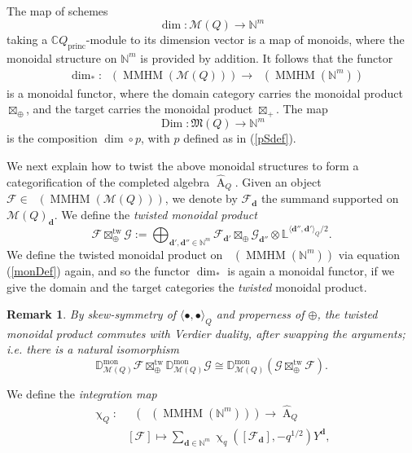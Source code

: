\documentclass[a4paper,10pt]{amsart}
\newtheorem{remark}[theorem]{Remark}
\newcommand{\dd}{\mathbf{d}}
\newcommand{\DD}{\mathbb{D}}
\newcommand{\LL}{\mathbb{L}}
\newcommand{\Mst}{\mathfrak{M}}
\newcommand{\Msp}{\mathcal{M}}
\renewcommand{\chi}{\upchi}
\DeclareMathOperator{\KK}{K_0}
\DeclareMathOperator{\Dim}{Dim}
\DeclareMathOperator{\tw}{tw}
\DeclareMathOperator{\Ror}{A}
\DeclareMathOperator{\mon}{mon}
\DeclareMathOperator{\MMHM}{MMHM}
\DeclareMathOperator{\princ}{princ}
\DeclareMathOperator{\Dulf}{\mathcal{D}^{\geq, lf}}
\begin{document}
The map of schemes 
\[
\dim\colon\Msp(Q)\rightarrow\mathbb{N}^{m}
\]
taking a $\mathbb{C}Q_{\princ}$-module to its dimension vector is a map of monoids, where the monoidal structure on $\mathbb{N}^m$ is provided by addition.  It follows that the functor
\begin{align*}
&\dim_*\colon \Dulf\left(\MMHM(\Msp(Q))\right)\rightarrow\Dulf(\MMHM(\mathbb{N}^{m}))
\end{align*}
is a monoidal functor, where the domain category carries the monoidal product $\boxtimes_{\oplus}$, and the target carries the monoidal product $\boxtimes_+$.  The map 
\[
\Dim\colon \Mst(Q)\rightarrow\mathbb{N}^m
\]
is the composition $\dim\circ p$, with $p$ defined as in (\ref{pSdef}).

We next explain how to twist the above monoidal structures to form a categorification of the completed algebra $\hat{\Ror}_{Q}$.  Given an object $\mathcal{F}\in\Dulf\left(\MMHM(\Msp(Q))\right)$, we denote by $\mathcal{F}_\dd$ the summand supported on $\Msp(Q)_{\dd}$.  We define the \textit{twisted monoidal product}
\begin{equation}
\label{monDef}
\mathcal{F}\boxtimes_{\oplus}^{\tw}\mathcal{G}:=\bigoplus_{\dd',\dd''\in\mathbb{N}^{m}}\mathcal{F}_{\dd'}\boxtimes_{\oplus}\mathcal{G}_{\dd''}\otimes\mathbb{L}^{\langle \dd'',\dd'\rangle_Q /2}.
\end{equation}
We define the twisted monoidal product on $\Dulf(\MMHM(\mathbb{N}^m))$ via equation (\ref{monDef}) again, and so the functor $\dim_*$ is again a monoidal functor, if we give the domain and the target categories the \textit{twisted} monoidal product.  
\begin{remark}
\label{vswap}
By skew-symmetry of $\langle\bullet,\bullet\rangle_Q$ and properness of $\oplus$, the twisted monoidal product commutes with Verdier duality, after swapping the arguments; i.e. there is a natural isomorphism
\[
\DD^{\mon}_{\Msp(Q)}\mathcal{F}\boxtimes_{\oplus}^{\tw}\DD^{\mon}_{\Msp(Q)}\mathcal{G}\cong\DD^{\mon}_{\Msp(Q)}\left(\mathcal{G}\boxtimes_{\oplus}^{\tw}\mathcal{F}\right).
\]
\end{remark}
We define the \textit{integration map}
\begin{align}\label{IM}
\chi_{Q}\colon& \KK\left(\Dulf(\MMHM(\mathbb{N}^{m}))\right)\rightarrow\hat{\Ror}_Q\\
&[\mathcal{F}]\mapsto\sum_{\dd\in\mathbb{N}^{m}}\chi_{q}([\mathcal{F}_\dd],-q^{1/2})Y^{\dd},\label{dulfjust}
\end{align}
\end{document}
